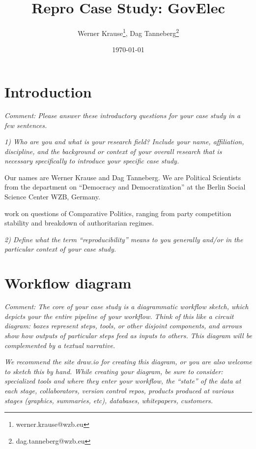 \documentclass[
  11pt
]{article}
\title{Repro Case Study: GovElec}
\author{Werner Krause\thanks{werner.krause@wzb.eu}, Dag Tanneberg\thanks{dag.tanneberg@wzb.eu}}
\date{\today}
\begin{document}
\maketitle

\thispagestyle{empty}

\clearpage
\setcounter{page}{1}
\onehalfspacing

\section{Introduction}
\textit{Comment: Please answer these introductory questions for your case study in a few sentences.}

\noindent
\textit{1) Who are you and what is your research field? Include your name, affiliation, discipline, and the background or context of your overall research that is necessary specifically to introduce your specific case study.}

Our names are Werner Krause and Dag Tanneberg. We are
Political Scientists from the department on ``Democracy and
Democratization'' at the Berlin Social Science Center
WZB, Germany. 

work on
questions of Comparative Politics, ranging from party
competition stability and breakdown of authoritarian regimes. 

\textit{2) Define what the term ``reproducibility'' means to you generally and/or in the particular context of your case study.}

\section{Workflow diagram}
\textit{Comment: The core of your case study is a diagrammatic workflow sketch, which depicts your the entire pipeline of your workflow. Think of this like a circuit diagram: boxes represent steps, tools, or other disjoint components, and arrows show how outputs of particular steps feed as inputs to others. This diagram will be complemented by a textual narrative.}

\noindent
\textit{We recommend the site draw.io for creating this diagram, or you are also welcome to sketch this by hand. While creating your diagram, be sure to consider: specialized tools and where they enter your workflow, the ``state'' of the data at each stage, collaborators, version control repos, products produced at various stages (graphics, summaries, etc), databases, whitepapers, customers.}
\end{document}
